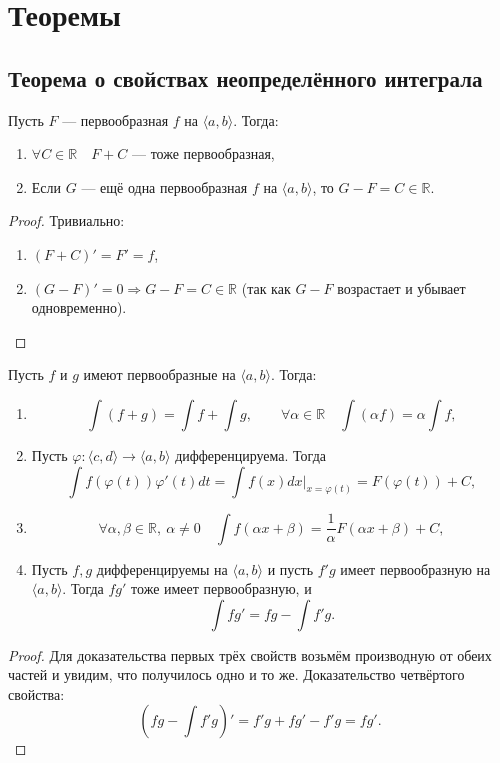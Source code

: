 \section{Теоремы}

\subsection{Теорема о свойствах неопределённого интеграла}

\begin{theorem}
	Пусть $F$ --- первообразная $f$ на $\langle a, b \rangle$. Тогда:
	\begin{enumerate}
		\item $\forall C \in \mathbb{R} \quad F + C$ --- тоже первообразная,
		\item Если $G$ --- ещё одна первообразная $f$ на $\langle a, b \rangle$, то $G - F = C \in \mathbb{R}$.
	\end{enumerate}
\end{theorem}

\begin{proof}
	Тривиально:
	\begin{enumerate}
		\item $(F + C)' = F' = f$,
		\item $(G - F)' = 0 \Rightarrow G - F = C \in \mathbb{R}$ (так как $G - F$ возрастает и убывает одновременно).
	\end{enumerate}
\end{proof}

\begin{theorem}
	Пусть $f$ и $g$ имеют первообразные на $\langle a, b \rangle$. Тогда:
	\begin{enumerate}
		\item \[
			\int (f + g) = \int f + \int g, \qquad \forall \alpha \in \mathbb{R} \quad \int (\alpha f) = \alpha \int f,
		\]
		\item Пусть $\varphi \colon \langle c, d \rangle \to \langle a, b \rangle$ дифференцируема. Тогда \[
			\int f(\varphi(t)) \varphi'(t) dt = \int f(x) dx \bigg|_{x = \varphi(t)} = F(\varphi(t)) + C,
		\]
		\item \[
			\forall \alpha, \beta \in \mathbb{R}, \ \alpha \neq 0 \quad \int f(\alpha x + \beta) = \frac1\alpha F(\alpha x + \beta) + C,
		\]
		\item Пусть $f, g$ дифференцируемы на $\langle a, b \rangle$ и пусть $f'g$ имеет первообразную на $\langle a, b \rangle$.
		Тогда $fg'$ тоже имеет первообразную, и \[
			\int fg' = fg - \int f'g.
		\]
	\end{enumerate}
\end{theorem}
\begin{proof}
		Для доказательства первых трёх свойств возьмём производную от обеих частей и увидим, что получилось одно и то же.
		Доказательство четвёртого свойства: \[
		\left( fg - \int f'g \right)' = f'g + fg' - f'g = fg'.
		\]
\end{proof}

